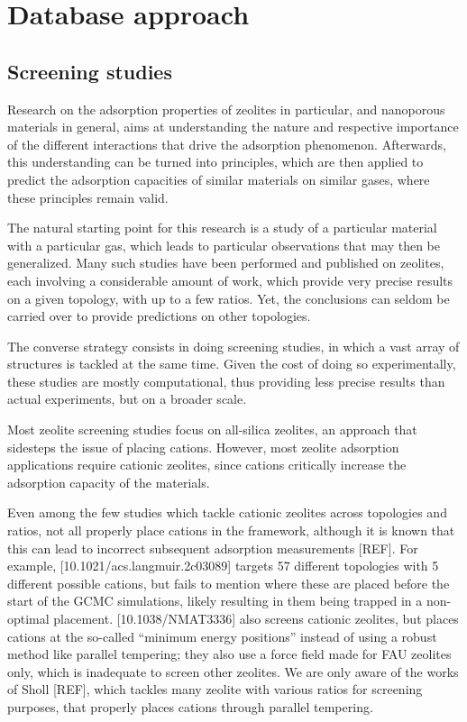 \documentclass[main.tex]{subfiles}
\begin{document}
\chapter{Database approach}
\vspace*{-1\baselineskip}

\section{Screening studies}

Research on the adsorption properties of zeolites in particular, and nanoporous materials in general, aims at understanding the nature and respective importance of the different interactions that drive the adsorption phenomenon. Afterwards, this understanding can be turned into principles, which are then applied to predict the adsorption capacities of similar materials on similar gases, where these principles remain valid.

The natural starting point for this research is a study of a particular material with a particular gas, which leads to particular observations that may then be generalized. Many such studies have been performed and published on zeolites, each involving a considerable amount of work, which provide very precise results on a given topology, with up to a few \SiAl ratios. Yet, the conclusions can seldom be carried over to provide predictions on other topologies.

The converse strategy consists in doing screening studies, in which a vast array of structures is tackled at the same time. Given the cost of doing so experimentally, these studies are mostly computational, thus providing less precise results than actual experiments, but on a broader scale.

Most zeolite screening studies focus on all-silica zeolites, an approach that sidesteps the issue of placing cations. However, most zeolite adsorption applications require cationic zeolites, since cations critically increase the adsorption capacity of the materials.

Even among the few studies which tackle cationic zeolites across topologies and \SiAl ratios, not all properly place cations in the framework, although it is known that this can lead to incorrect subsequent adsorption measurements [REF]. For example, [10.1021/acs.langmuir.2c03089] targets 57 different topologies with 5 different possible cations, but fails to mention where these are placed before the start of the GCMC simulations, likely resulting in them being trapped in a non-optimal placement. [10.1038/NMAT3336] also screens cationic zeolites, but places cations at the so-called ``minimum energy positions'' instead of using a robust method like parallel tempering; they also use a force field made for FAU zeolites only, which is inadequate to screen other zeolites. 
We are only aware of the works of Sholl [REF], which tackles many zeolite with various \SiAl ratios for screening purposes, that properly places cations through parallel tempering.
\end{document}
